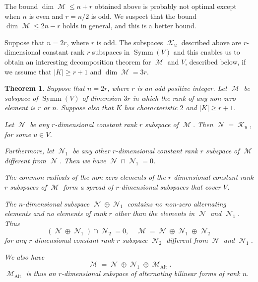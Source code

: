 \documentclass{amsart}
\DeclareMathOperator{\Alt}{Alt}
\DeclareMathOperator{\M}{\mathcal{M}}
\DeclareMathOperator{\N}{\mathcal{N}}
\DeclareMathOperator{\K}{\mathcal{K}}
\DeclareMathOperator{\Symm}{Symm}
\theoremstyle{plain}
\newtheorem{theorem}{Theorem}
\theoremstyle{definition}
\begin{document}
The bound $\dim \M\leq n+r$ obtained above is probably not optimal except when $n$ is even and $r=n/2$ is odd. We suspect that the bound
$\dim \M\leq 2n-r$ holds in general, and this is a better bound. 

 Suppose that $n=2r$, where $r$ is odd. 
The subspaces $\K_u$ described above are $r$-dimensional constant rank $r$ subspaces in $\Symm(V)$ and this enables us to obtain 
an interesting decomposition theorem for $\M$ and $V$, described below,
if we assume that $|K|\geq r+1$ and $\dim \M=3r$.

\begin{theorem} \label{spread_of_V}
 Suppose that $n=2r$, where $r$ is an odd positive integer.
Let $\M$ be subspace of $\Symm(V)$ of dimension $3r$ in which
the rank of any non-zero element is $r$ or $n$. Suppose also that $K$ has characteristic $2$ and $|K|\geq r+1$. 

Let $\N$ be any $r$-dimensional constant rank $r$ subspace of $\M$. Then $\N=\K_u$, for some $u\in V$. 

Furthermore, let $\N_1$ be any other  $r$-dimensional constant rank $r$ subspace of $\M$ different from $\N$. Then we have $\N\cap \N_1=0$.

The common radicals of the non-zero elements of the $r$-dimensional constant rank $r$ subspaces of $\M$ 
form a spread of $r$-dimensional subspaces that cover $V$. 

The $n$-dimensional subspace $\N\oplus \N_1$ contains no non-zero alternating elements and no elements of rank $r$ other than the elements in $\N$ 
and $\N_1$. Thus 
\[
(\N\oplus \N_1)\cap \N_2=0,\quad \M=\N\oplus \N_1\oplus \N_2
\] 
for any $r$-dimensional constant rank $r$ subspace $\N_2$ different from $\N$ and $\N_1$.

We also have
\[
 \M=\N\oplus \N_1\oplus \M_{\Alt}.
\]
$\M_{\Alt}$ is thus an $r$-dimensional subspace of alternating bilinear forms of rank $n$.

\end{theorem}
\end{document}
